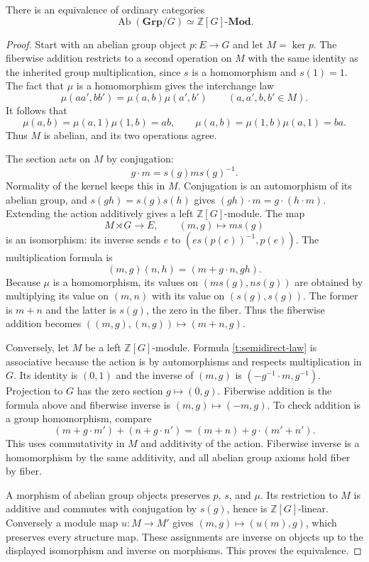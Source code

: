 \begin{theorem}
\label{t:beck}
There is an equivalence of ordinary categories
\[
 \operatorname{Ab}(\mathbf{Grp}/G)
 \simeq \mathbb Z[G]\text{-}\mathbf{Mod}.
\]
\end{theorem}
\begin{proof}
Start with an abelian group object $p:E\to G$ and let $M=\ker p$.
The fiberwise addition restricts to a second operation on $M$ with the
same identity as the inherited group multiplication, since $s$ is a
homomorphism and $s(1)=1$.  The fact that $\mu$ is a homomorphism gives
the interchange law
\[
 \mu(aa',bb')=\mu(a,b)\mu(a',b')\qquad(a,a',b,b'\in M).
\]
It follows that
\[
 \mu(a,b)=\mu(a,1)\mu(1,b)=ab,
 \qquad
 \mu(a,b)=\mu(1,b)\mu(a,1)=ba.
\]
Thus $M$ is abelian, and its two operations agree.

The section acts on $M$ by conjugation:
\[
 g\cdot m=s(g)ms(g)^{-1}.
\]
Normality of the kernel keeps this in $M$.  Conjugation is an automorphism
of its abelian group, and $s(gh)=s(g)s(h)$ gives
$(gh)\cdot m=g\cdot(h\cdot m)$.  Extending the action additively gives
a left $\mathbb Z[G]$-module.  The map
\[
 M\rtimes G\longrightarrow E,\qquad (m,g)\longmapsto m s(g)
\]
is an isomorphism: its inverse sends $e$ to
$(e s(p(e))^{-1},p(e))$.  The multiplication formula is
\begin{equation}\label{t:semidirect-law}
 (m,g)(n,h)=(m+g\cdot n,gh).
\end{equation}
Because $\mu$ is a homomorphism, its values on
$(m s(g),n s(g))$ are obtained by multiplying its value on $(m,n)$ with
its value on $(s(g),s(g))$.  The former is $m+n$ and the latter is $s(g)$,
the zero in the fiber.  Thus the fiberwise addition becomes
$((m,g),(n,g))\mapsto(m+n,g)$.

Conversely, let $M$ be a left $\mathbb Z[G]$-module.  Formula
\eqref{t:semidirect-law} is associative because the action is by
automorphisms and respects multiplication in $G$.  Its identity is $(0,1)$
and the inverse of $(m,g)$ is $(-g^{-1}\cdot m,g^{-1})$.
Projection to $G$ has the zero section $g\mapsto(0,g)$.  Fiberwise addition
is the formula above and fiberwise inverse is $(m,g)\mapsto(-m,g)$.
To check addition is a group homomorphism, compare
\[
 (m+g\cdot m')+(n+g\cdot n')
   =(m+n)+g\cdot(m'+n').
\]
This uses commutativity in $M$ and additivity of the action.  Fiberwise
inverse is a homomorphism by the same additivity, and all abelian group
axioms hold fiber by fiber.

A morphism of abelian group objects preserves $p$, $s$, and $\mu$.
Its restriction to $M$ is additive and commutes with conjugation by
$s(g)$, hence is $\mathbb Z[G]$-linear.  Conversely a module map
$u:M\to M'$ gives $(m,g)\mapsto(u(m),g)$, which preserves every structure
map.  These assignments are inverse on objects up to the displayed
isomorphism and inverse on morphisms.  This proves the equivalence.
\end{proof}

